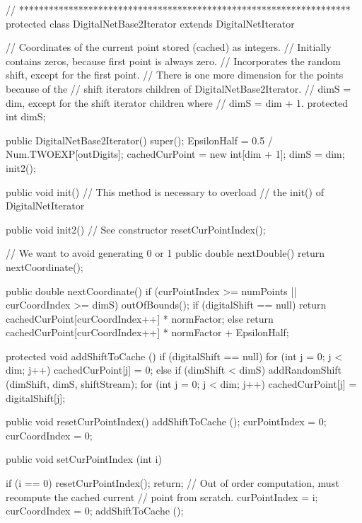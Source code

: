 \begin{code}\begin{hide}

   // *******************************************************************
   protected class DigitalNetBase2Iterator extends DigitalNetIterator {

      // Coordinates of the current point stored (cached) as integers.
      // Initially contains zeros, because first point is always zero.
      // Incorporates the random shift, except for the first point.
      // There is one more dimension for the points because of the
      // shift iterators children of DigitalNetBase2Iterator.
      // dimS = dim, except for the shift iterator children where
      // dimS = dim + 1.
      protected int dimS;

      public DigitalNetBase2Iterator() {
         super();
         EpsilonHalf = 0.5 / Num.TWOEXP[outDigits];
         cachedCurPoint = new int[dim + 1];
         dimS = dim;
         init2();
      }

      public void init() {   // This method is necessary to overload
      }                      // the init() of DigitalNetIterator

      public void init2() { // See constructor
         resetCurPointIndex();
      }

      // We want to avoid generating 0 or 1
      public double nextDouble() {
         return nextCoordinate();
      }

      public double nextCoordinate() {
         if (curPointIndex >= numPoints || curCoordIndex >= dimS)
            outOfBounds();
         if (digitalShift == null)
            return cachedCurPoint[curCoordIndex++] * normFactor;
         else
            return cachedCurPoint[curCoordIndex++] * normFactor + EpsilonHalf;
      }

      protected void addShiftToCache () {
         if (digitalShift == null)
            for (int j = 0; j < dim; j++)
               cachedCurPoint[j] = 0;
         else {
            if (dimShift < dimS)
               addRandomShift (dimShift, dimS, shiftStream);
            for (int j = 0; j < dim; j++)
               cachedCurPoint[j] = digitalShift[j];
         }
      }

      public void resetCurPointIndex() {
         addShiftToCache ();
         curPointIndex = 0;
         curCoordIndex = 0;
      }

      public void setCurPointIndex (int i) {
         if (i == 0) {
            resetCurPointIndex();   return;
         }
         // Out of order computation, must recompute the cached current
         // point from scratch.
         curPointIndex = i;
         curCoordIndex = 0;
         addShiftToCache ();

}}
\end{hide}
\end{code}

